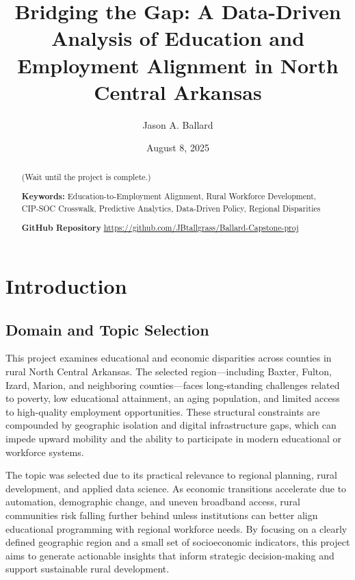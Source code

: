 \documentclass[12pt]{llncs}
\title{Bridging the Gap: A Data-Driven Analysis of Education and Employment Alignment in North Central Arkansas}
\author{Jason A. Ballard} \date{August 8, 2025}
\institute{Northwest Missouri State University, Maryville MO 64468, USA \\
\email{s574020@nwmissouri.edu}, {ballardjasona@gmail.com}}
\begin{document}
\maketitle

\begin{abstract}
(Wait until the project is complete.)

\noindent\textbf{Keywords:} Education-to-Employment Alignment, Rural Workforce Development, CIP-SOC Crosswalk, Predictive Analytics, Data-Driven Policy, Regional Disparities

\noindent\textbf{GitHub Repository} 
\href{https://github.com/JBtallgrass/Ballard-Capstone-proj}{https://github.com/JBtallgrass/Ballard-Capstone-proj}
\end{abstract}

\section{Introduction}

\subsection{Domain and Topic Selection}
This project examines educational and economic disparities across counties in rural North Central Arkansas. The selected region—including Baxter, Fulton, Izard, Marion, and neighboring counties—faces long-standing challenges related to poverty, low educational attainment, an aging population, and limited access to high-quality employment opportunities. These structural constraints are compounded by geographic isolation and digital infrastructure gaps, which can impede upward mobility and the ability to participate in modern educational or workforce systems.\par
The topic was selected due to its practical relevance to regional planning, rural development, and applied data science. As economic transitions accelerate due to automation, demographic change, and uneven broadband access, rural communities risk falling further behind unless institutions can better align educational programming with regional workforce needs\cite{corirural_2023}. By focusing on a clearly defined geographic region and a small set of socioeconomic indicators, this project aims to generate actionable insights that inform strategic decision-making and support sustainable rural development.
\end{document}
